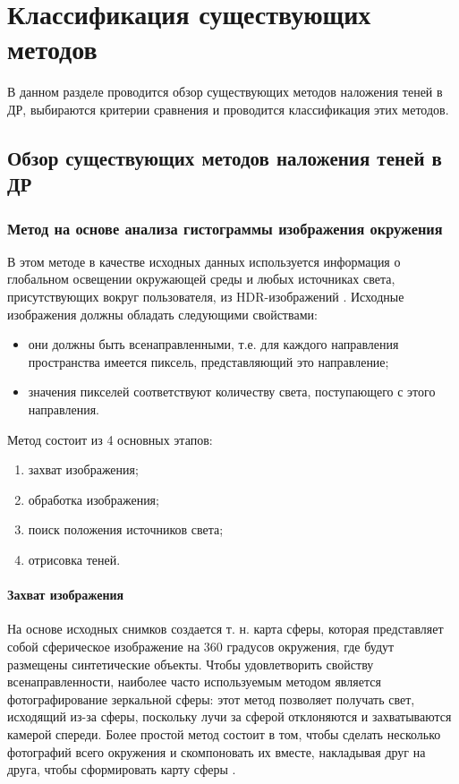 \chapter{Классификация существующих методов}

В данном разделе проводится обзор существующих методов наложения теней в ДР, выбираются критерии сравнения и проводится классификация этих методов.

\section{Обзор существующих методов наложения теней в ДР}

\subsection{Метод на основе анализа гистограммы изображения окружения}

В этом методе в качестве исходных данных используется информация о глобальном освещении окружающей среды и любых источниках света, присутствующих вокруг пользователя, из HDR-изображений \cite{osti2019real}. Исходные изображения должны обладать следующими свойствами:

\begin{itemize}
	\item они должны быть всенаправленными, т.е. для каждого направления пространства имеется пиксель, представляющий это направление;
	\item значения пикселей соответствуют количеству света, поступающего с этого направления.
\end{itemize}

Метод состоит из 4 основных этапов:

\begin{enumerate}
	\item захват изображения;
	\item обработка изображения;
	\item поиск положения источников света;
	\item отрисовка теней.
\end{enumerate}

\subsubsection*{Захват изображения}

На основе исходных снимков создается т. н. карта сферы, которая представляет собой сферическое изображение на 360 градусов окружения, где будут размещены синтетические объекты. Чтобы удовлетворить свойству всенаправленности, наиболее часто используемым методом является фотографирование зеркальной сферы: этот метод позволяет получать свет, исходящий из-за сферы, поскольку лучи за сферой отклоняются и захватываются камерой спереди. Более простой метод состоит в том, чтобы сделать несколько фотографий всего окружения и скомпоновать их вместе, накладывая друг на друга, чтобы сформировать карту сферы \cite{osti2019real}.

